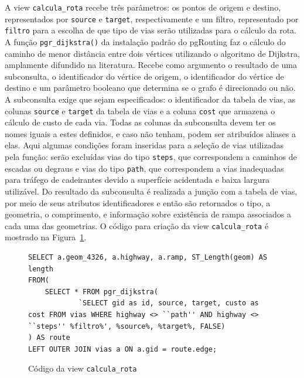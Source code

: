 \documentclass[oneside,openright,12pt]{ufsm_2015} %
\begin{document}
A view {\tt calcula\_rota} recebe três parâmetros: os pontos de origem e destino, representados por {\tt source} e {\tt target}, respectivamente e um filtro, representado por {\tt filtro} para a escolha de que tipo de vias serão utilizadas para o cálculo da rota. 
A função {\tt pgr\_dijkstra()} da instalação padrão do pgRouting faz o cálculo do caminho de menor distância entre dois vértices utilizando o algoritmo de Dijkstra, amplamente difundido na literatura. 
Recebe como argumento o resultado de uma subconsulta, o identificador do vértice de origem, o identificador do vértice de destino e um parâmetro booleano que determina se o grafo é direcionado ou não. 
A subconsulta exige que sejam especificados: o identificador da tabela de vias, as colunas {\tt source} e {\tt target} da tabela de vias e a coluna {\tt cost} que armazena o cálculo de custo de cada via. Todas as colunas da subconsulta devem ter os nomes iguais a estes definidos, e caso não tenham, podem ser atribuídos aliases a elas. 
Aqui algumas condições foram inseridas para a seleção de vias utilizadas pela função: serão excluídas vias do tipo {\tt steps}, que correspondem a caminhos de escadas ou degraus e vias do tipo {\tt path}, que correspondem a vias inadequadas para tráfego de cadeirantes devido a superfície acidentada e baixa largura utilizável. 
Do resultado da subconsulta é realizada a junção com a tabela de vias, por meio de seus atributos identificadores e então são retornados o tipo, a geometria, o comprimento, e informação sobre existência de rampa associados a cada uma das geometrias. O código para criação da view {\tt calcula\_rota} é mostrado na Figura~\ref{codigo:view_rota}.


\begin{figure}[h!]
    \centering
       \caption{Código da view \tt{calcula\_rota}}
    \label{codigo:view_rota}
   \begin{lstlisting}[]
SELECT a.geom_4326, a.highway, a.ramp, ST_Length(geom) AS length
FROM(
    SELECT * FROM pgr_dijkstra(
            `SELECT gid as id, source, target, custo as cost FROM vias WHERE highway <> ``path'' AND highway <> ``steps'' %filtro%', %source%, %target%, FALSE)
) AS route
LEFT OUTER JOIN vias a ON a.gid = route.edge;
\end{lstlisting}  
 
\end{figure}
\end{document}
